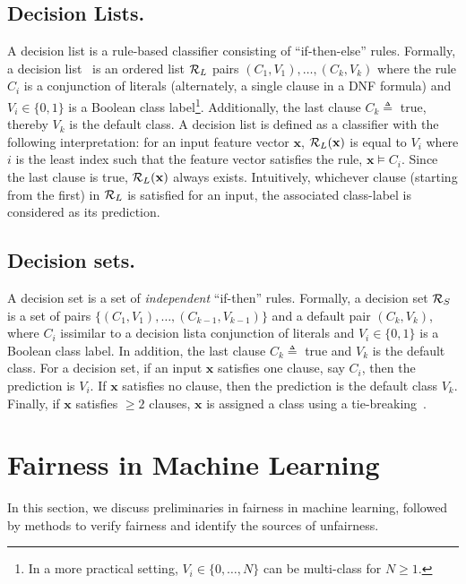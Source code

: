 \subsection{Decision Lists.} A decision list is a rule-based classifier consisting of ``if-then-else'' rules. Formally, a decision list~\cite{rivest1987learning} is an ordered list $ {\mathcal{R}}_L $ pairs $ (C_1, V_1), \dots, (C_k, V_k) $ where the  rule $ C_i $ is a conjunction of literals (alternately, a single clause in a DNF formula) and $ V_i \in \{0,1\} $ is  a Boolean class label\footnote{In a more practical setting, $ V_i \in \{0, \dots, N\} $  can be multi-class for $ N \ge 1 $.}. Additionally, the last clause $ C_k \triangleq  $ true, thereby $ V_k $ is the default class. A decision list is defined as a classifier with the following interpretation: for an input feature vector $ \mathbf{x} $,  $ {\mathcal{R}}_L(\mathbf{x}) $ is equal to $ V_i $ where $ i $ is the least index such that the feature vector satisfies the rule, $ \mathbf{x} \models C_i $. Since the last clause is true, $ {\mathcal{R}}_L(\mathbf{x}) $ always exists. Intuitively, whichever clause (starting from the first) in $ {\mathcal{R}}_L $ is satisfied for an input, the associated class-label is considered as its prediction.

\subsection{Decision sets.} A decision set is a set of \textit{independent} ``if-then'' rules. Formally,  a decision set $ {\mathcal{R}}_S $ is a set of pairs $ \{(C_1, V_1), \dots, (C_{k-1}, V_{k-1})\}  $ and a  default pair $ (C_k, V_k) $, where $ C_i $ is\textemdash similar to a decision list\textemdash a conjunction of literals and $ V_i \in \{0,1\} $ is a Boolean class label. In addition, the last clause $ C_k \triangleq  $ true and $ V_k $ is the default class. For a  decision set, if an input $ \mathbf{x} $ satisfies one clause, say $ C_i $, then the prediction is $ V_i $. If $ \mathbf{x} $ satisfies no clause, then the prediction is the default class $ V_k $. Finally, if $ \mathbf{x} $ satisfies  $ \ge 2 $ clauses, $ \mathbf{x} $ is assigned a class using a tie-breaking~\cite{lakkaraju2016interpretable}. 



\section{Fairness in Machine Learning}
\label{chapter_fairness_preliminaries}
In this section, we discuss preliminaries in fairness in machine learning, followed by methods to verify fairness and identify the sources of unfairness. 

